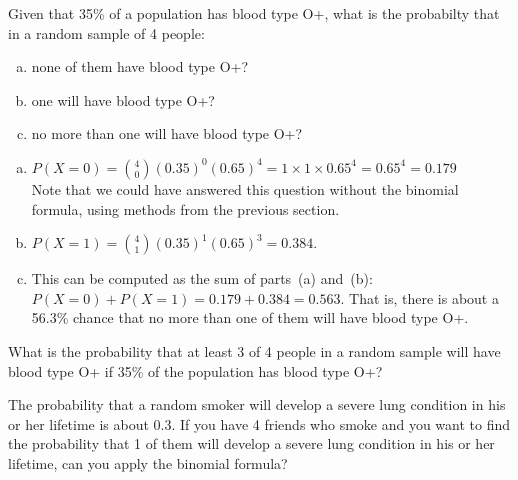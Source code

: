 \begin{examplewrap}
\begin{nexample}
{Given that 35\% of a population has blood type O+, what is the probabilty that in a random sample of 4 people:  
\begin{enumerate}[(a)]
\setlength{\itemsep}{0mm}
\item
    none of them have blood type O+?
\item
    one will have blood type O+?
\item
    no more than one will have blood type O+?
\end{enumerate}
}
\begin{enumerate}[(a)]
\item
  $P(X=0)
    = {4 \choose 0} (0.35)^0 (0.65)^4
    = 1\times1\times 0.65^4 = 0.65^4
    = 0.179$\\
Note that we could have answered this question without the binomial formula, using methods from the previous section.
\item 
  $P(X=1)
    = {4 \choose 1} (0.35)^1(0.65)^{3}
    = 0.384$.
  \item This can be computed as the sum of parts~(a) and~(b):
  $P(X=0) + P(X=1) = 0.179 + 0.384 = 0.563$.
  That is, there is about a 56.3\% chance that no more than
  one of them will have blood type O+.
\end{enumerate}
\label{bloodTypeOPos}
\end{nexample}
\end{examplewrap}


\begin{exercisewrap}
\begin{nexercise}
What is the probability that at least 3 of 4 people in a random sample will have blood type O+ if 35\% of the population has blood type O+?\footnotemark
\end{nexercise}
\end{exercisewrap}


 \begin{exercisewrap}
\begin{nexercise}
The probability that a random smoker will develop a severe
lung condition in his or her lifetime is about $0.3$.
If you have 4 friends who smoke and you want to find the probability that 1 of them will develop a severe lung condition in his or her lifetime, can you apply the binomial formula?\footnotemark
\end{nexercise}
\end{exercisewrap}




